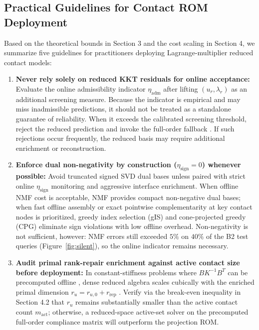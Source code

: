 \documentclass[11pt,a4paper]{article}
\providecommand{\tightlist}{\setlength{\itemsep}{0pt}\setlength{\parskip}{0pt}}
\begin{document}
\hypertarget{practical-guidelines-for-contact-rom-deployment}{%
\subsection{Practical Guidelines for Contact ROM Deployment}\label{practical-guidelines-for-contact-rom-deployment}}

Based on the theoretical bounds in Section 3 and the cost scaling in Section 4, we summarize five guidelines for practitioners deploying Lagrange-multiplier reduced contact models:

\begin{enumerate}
\def\labelenumi{\arabic{enumi}.}
\tightlist
\item
  \textbf{Never rely solely on reduced KKT residuals for online acceptance:}
  Evaluate the online admissibility indicator \(\eta_{\text{adm}}\) after lifting \((u_r, \lambda_r)\) as an additional screening measure. Because the indicator is empirical and may miss inadmissible predictions, it should not be treated as a standalone guarantee of reliability. When it exceeds the calibrated screening threshold, reject the reduced prediction and invoke the full-order fallback \cite{dabaghi2020posteriori}. If such rejections occur frequently, the reduced basis may require additional enrichment \cite{leberre2022condition} or reconstruction.
\item
  \textbf{Enforce dual non-negativity by construction (\(\eta_{\text{sign}} = 0\)) whenever possible:}
  Avoid truncated signed SVD dual bases unless paired with strict online \(\eta_{\text{sign}}\) monitoring and aggressive interface enrichment. When offline NMF cost is acceptable, NMF \cite{balajewicz2016projection} provides compact non-negative dual bases; when fast offline assembly or exact pointwise complementarity at key contact nodes is prioritized, greedy index selection (gIS) \cite{sambataro2026model, kollepara2024sparse} and cone-projected greedy (CPG) \cite{benaceur2020reduced} eliminate sign violations with low offline overhead. Non-negativity is not sufficient, however: NMF errors still exceeded \(5\%\) on \(40\%\) of the B2 test queries (Figure~\ref{fig:silent}), so the online indicator remains necessary.
\item
  \textbf{Audit primal rank-repair enrichment against active contact size before deployment:}
  In constant-stiffness problems where \(B K^{-1} B^T\) can be precomputed offline \cite{pawar2025efficient}, dense reduced algebra scales cubically with the enriched primal dimension \(r_u = r_{u,0} + r_{\text{rep}}\) \cite{leberre2022condition}. Verify via the break-even inequality in Section 4.2 that \(r_u\) remains substantially smaller than the active contact count \(m_{\text{act}}\); otherwise, a reduced-space active-set solver on the precomputed full-order compliance matrix \cite{franceschini2022block} will outperform the projection ROM.

\end{enumerate}
\end{document}

